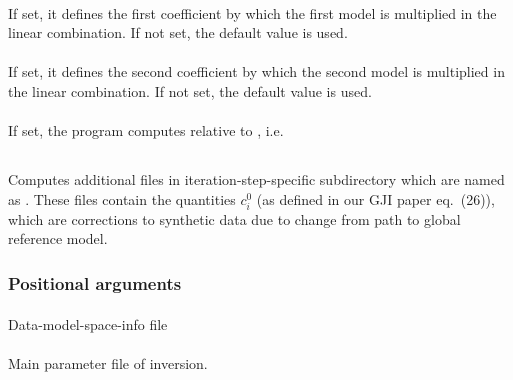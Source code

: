 \paragraph{ }
If set, it defines the first coefficient  by which the first model is multiplied in the linear 
combination. If not set, the default value  is used.
\paragraph{ }
If set, it defines the second coefficient  by which the second model is multiplied in the linear 
combination. If not set, the default value  is used.
\paragraph{}
If set, the program computes relative to , i.e.\ \\
%
%
\subsection{} \label{programs_scripts,sec:bin_prog,sec:comp_correct_syn_data}
Computes additional files in iteration-step-specific subdirectory  which are named as
. These files contain the quantities $c_i^0$ (as defined in our GJI paper
eq.\ (26)), which are corrections to synthetic data due to change from path to global reference model.
\subsubsection{Positional arguments}
\paragraph{}
Data-model-space-info file
\paragraph{}
Main parameter file of inversion.
%
%
